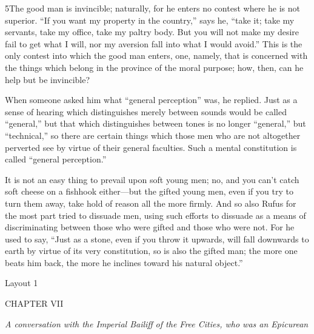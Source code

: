 5The good man is invincible; naturally, for he enters no contest where he is not superior. ``If you want my property in the country,'' says he, ``take it; take my servants, take my office, take my paltry body. But you will not make my desire fail to get what I will, nor my aversion fall into what I would avoid.'' This is the only contest into which the good man enters, one, namely, that is concerned with the things which belong in the province of the moral purpose; how, then, can he help but be invincible?

When someone asked him what ``general perception'' was, he replied. Just as a sense of hearing which distinguishes merely between sounds would be called ``general,'' but that which distinguishes between tones is no longer ``general,'' but ``technical,'' so there are certain things which those men who are not altogether perverted see by virtue of their general faculties. Such a mental constitution is called ``general perception.''

It is not an easy thing to prevail upon soft young men; no, and you can't catch soft cheese on a fishhook either—but the gifted young men, even if you try to turn them away, take hold of reason all the more firmly. And so also Rufus for the most part tried to dissuade men, using such efforts to dissuade as a means of discriminating between those who were gifted and those who were not. For he used to say, ``Just as a stone, even if you throw it upwards, will fall downwards to earth by virtue of its very constitution, so is also the gifted man; the more one beats him back, the more he inclines toward his natural object.''



Layout 1

CHAPTER VII

\emph{A conversation with the Imperial Bailiff} \emph{of the Free Cities, who was an Epicurean}

